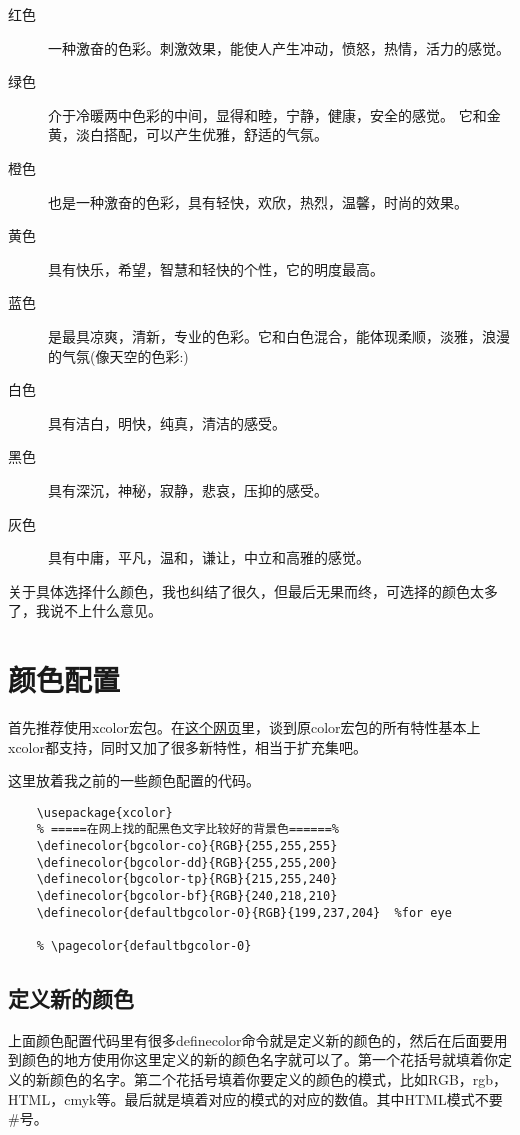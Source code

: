 \documentclass[11pt,oneside]{book}
\begin{document}
  \begin{description}
  \item[红色] 一种激奋的色彩。刺激效果，能使人产生冲动，愤怒，热情，活力的感觉。
  \item[绿色] 介于冷暖两中色彩的中间，显得和睦，宁静，健康，安全的感觉。 它和金黄，淡白搭配，可以产生优雅，舒适的气氛。
  \item[橙色] 也是一种激奋的色彩，具有轻快，欢欣，热烈，温馨，时尚的效果。
  \item[黄色] 具有快乐，希望，智慧和轻快的个性，它的明度最高。
  \item[蓝色] 是最具凉爽，清新，专业的色彩。它和白色混合，能体现柔顺，淡雅，浪漫的气氛(像天空的色彩:)
  \item[白色] 具有洁白，明快，纯真，清洁的感受。
  \item[黑色] 具有深沉，神秘，寂静，悲哀，压抑的感受。
  \item[灰色] 具有中庸，平凡，温和，谦让，中立和高雅的感觉。 　　
  \end{description}
  关于具体选择什么颜色，我也纠结了很久，但最后无果而终，可选择的颜色太多了，我说不上什么意见。


  \section{颜色配置}
  首先推荐使用xcolor宏包。在\href{http://tex.stackexchange.com/questions/89763/when-to-use-the-xcolor-package-instead-of-the-color-package}{这个网页}里，谈到原color宏包的所有特性基本上xcolor都支持，同时又加了很多新特性，相当于扩充集吧。

  这里放着我之前的一些颜色配置的代码。
  \begin{Verbatim}
    \usepackage{xcolor}
    % =====在网上找的配黑色文字比较好的背景色======%
    \definecolor{bgcolor-co}{RGB}{255,255,255}
    \definecolor{bgcolor-dd}{RGB}{255,255,200}
    \definecolor{bgcolor-tp}{RGB}{215,255,240}
    \definecolor{bgcolor-bf}{RGB}{240,218,210}
    \definecolor{defaultbgcolor-0}{RGB}{199,237,204}  %for eye

    % \pagecolor{defaultbgcolor-0}
  \end{Verbatim}


  \subsection{定义新的颜色}
  上面颜色配置代码里有很多definecolor命令就是定义新的颜色的，然后在后面要用到颜色的地方使用你这里定义的新的颜色名字就可以了。第一个花括号就填着你定义的新颜色的名字。第二个花括号填着你要定义的颜色的模式，比如RGB，rgb，HTML，cmyk等。最后就是填着对应的模式的对应的数值。其中HTML模式不要\#号。
\end{document}

